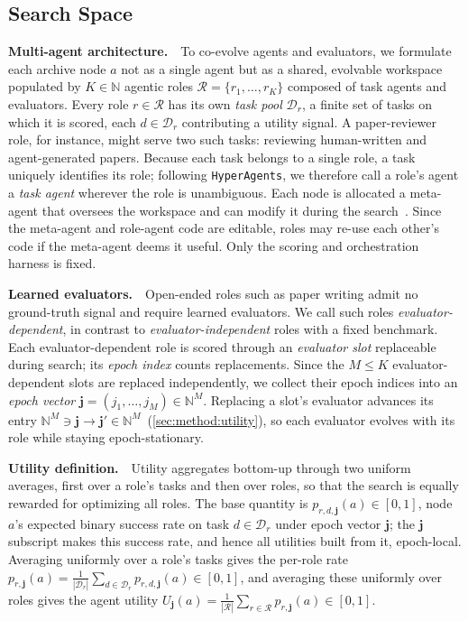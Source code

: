 \documentclass{paper}
\newcommand{\hyperagents}{\texttt{HyperAgents}\xspace}
\begin{document}
\subsection{Search Space}
\label{sec:method:multiagent}

\noindent\textbf{Multi-agent architecture.}~~To co-evolve agents and evaluators, we formulate each archive node $a$ not as a single agent but as a shared, evolvable workspace populated by $K\in\mathbb{N}$ agentic roles $\mathcal{R}=\{r_1,\ldots,r_K\}$ composed of task agents and evaluators. Every role $r\in\mathcal{R}$ has its own \emph{task pool} $\mathcal{D}_r$, a finite set of tasks on which it is scored, each $d\in\mathcal{D}_r$ contributing a utility signal. A paper-reviewer role, for instance, might serve two such tasks: reviewing human-written and agent-generated papers. Because each task belongs to a single role, a task uniquely identifies its role; following \hyperagents, we therefore call a role's agent a \emph{task agent} wherever the role is unambiguous. Each node is allocated a meta-agent that oversees the workspace and can modify it during the search~\citep{zhang2026hyperagents}. Since the meta-agent and role-agent code are editable, roles may re-use each other's code if the meta-agent deems it useful. Only the scoring and orchestration harness is fixed.

\noindent\textbf{Learned evaluators.}~~Open-ended roles such as paper writing admit no ground-truth signal and require learned evaluators. We call such roles \emph{evaluator-dependent}, in contrast to \emph{evaluator-independent} roles with a fixed benchmark. Each evaluator-dependent role is scored through an \emph{evaluator slot} replaceable during search; its \emph{epoch index} counts replacements. Since the $M\le K$ evaluator-dependent slots are replaced independently, we collect their epoch indices into an \emph{epoch vector} $\boldsymbol{j}=(j_1,\dots,j_M)\in\mathbb{N}^{M}$. Replacing a slot's evaluator advances its entry $\mathbb{N}^{M}\ni\boldsymbol{j}\rightarrow\boldsymbol{j}'\in\mathbb{N}^{M} $~(\cref{sec:method:utility}), so each evaluator evolves with its role while staying epoch-stationary.

\noindent\textbf{Utility definition.}~~Utility aggregates bottom-up through two uniform averages, first over a role's tasks and then over roles, so that the search is equally rewarded for optimizing all roles.\footnotemark{} The base quantity is $p_{r,d,\boldsymbol{j}}(a)\in[0,1]$, node $a$'s expected binary success rate on task $d\in\mathcal{D}_r$ under epoch vector $\boldsymbol{j}$; the $\boldsymbol{j}$ subscript makes this success rate, and hence all utilities built from it, epoch-local. Averaging uniformly over a role's tasks gives the per-role rate $p_{r,\boldsymbol{j}}(a)=\frac{1}{|\mathcal{D}_r|}\sum_{d\in\mathcal{D}_r}p_{r,d,\boldsymbol{j}}(a)\in[0,1]$, and averaging these uniformly over roles gives the agent utility $U_{\boldsymbol{j}}(a) = \frac{1}{|\mathcal{R}|}\sum_{r\in\mathcal{R}}p_{r,\boldsymbol{j}}(a)\in[0,1]$.
\end{document}

